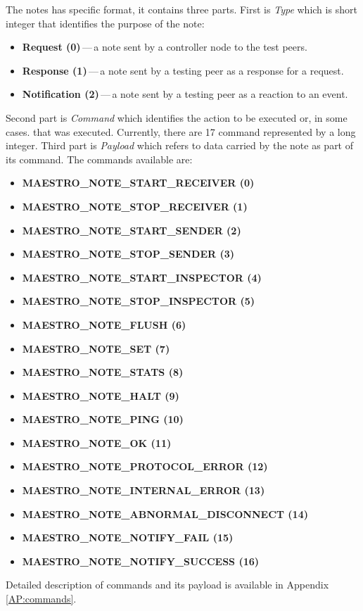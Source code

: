 
The notes has specific format, it contains three parts. First is \emph{Type} which is short integer that identifies the purpose of the note:

\begin{itemize}
	\setlength\itemsep{0em}
	\item \textbf{Request (0)}\,---\,a note sent by a controller node to the test peers.
	\item \textbf{Response (1)}\,---\,a note sent by a testing peer as a response for a request.
	\item \textbf{Notification (2)}\,---\,a note sent by a testing peer as a reaction to an event.
\end{itemize}
Second part is \emph{Command} which identifies the action to be executed or, in some cases. that was executed. Currently, there are 17 command represented by a long integer. Third part is \emph{Payload} which refers to data carried by the note as part of its command. The commands available are:

\begin{itemize}
	\setlength\itemsep{0em}
	\item \textbf{MAESTRO\_NOTE\_START\_RECEIVER (0)}
	\item \textbf{MAESTRO\_NOTE\_STOP\_RECEIVER (1)}
	\item \textbf{MAESTRO\_NOTE\_START\_SENDER (2)}
	\item \textbf{MAESTRO\_NOTE\_STOP\_SENDER (3)}
	\item \textbf{MAESTRO\_NOTE\_START\_INSPECTOR (4)}
	\item \textbf{MAESTRO\_NOTE\_STOP\_INSPECTOR (5)}
	\item \textbf{MAESTRO\_NOTE\_FLUSH (6)}
	\item \textbf{MAESTRO\_NOTE\_SET (7)}
	\item \textbf{MAESTRO\_NOTE\_STATS (8)}
	\item \textbf{MAESTRO\_NOTE\_HALT (9)}
	\item \textbf{MAESTRO\_NOTE\_PING (10)}
	\item \textbf{MAESTRO\_NOTE\_OK (11)}
	\item \textbf{MAESTRO\_NOTE\_PROTOCOL\_ERROR (12)}
	\item \textbf{MAESTRO\_NOTE\_INTERNAL\_ERROR (13)}
	\item \textbf{MAESTRO\_NOTE\_ABNORMAL\_DISCONNECT (14)}
	\item \textbf{MAESTRO\_NOTE\_NOTIFY\_FAIL (15)}
	\item \textbf{MAESTRO\_NOTE\_NOTIFY\_SUCCESS (16)}
\end{itemize}
Detailed description of commands and its payload is available in Appendix \ref{AP:commands}.


